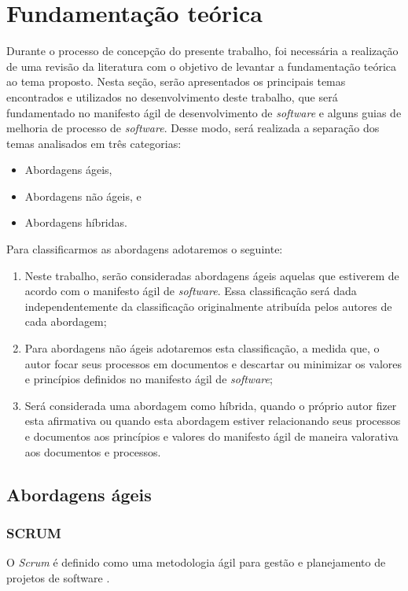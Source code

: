 \documentclass{acm_proc_article-sp}
\begin{document}
\section{Fundamentação teórica}
Durante o processo de concepção do presente trabalho, foi necessária a realização de uma revisão da literatura com o objetivo de levantar a fundamentação teórica ao tema proposto. Nesta seção, serão apresentados os principais temas encontrados e utilizados no desenvolvimento deste trabalho, que será fundamentado no manifesto ágil de desenvolvimento de \textit{software} \cite{manifesto:agil} e alguns guias de melhoria de processo de \textit{software}. Desse modo, será realizada a separação dos temas analisados em três categorias:

\begin{itemize}
\item Abordagens ágeis,
\item Abordagens não ágeis, e
\item Abordagens híbridas.
\end{itemize}

Para classificarmos as abordagens adotaremos o seguinte: 

\begin{enumerate}
\item  Neste trabalho, serão consideradas abordagens ágeis aquelas que estiverem de acordo com o manifesto ágil de \textit{software}. Essa classificação será dada independentemente da classificação originalmente atribuída pelos autores de cada abordagem;
\item Para abordagens não ágeis adotaremos esta classificação, a medida que, o autor focar seus processos em documentos e descartar ou minimizar os valores e princípios definidos no manifesto ágil de \textit{software};
\item Será considerada uma abordagem como híbrida, quando o próprio autor fizer esta afirmativa ou quando esta abordagem estiver relacionando seus processos e documentos aos princípios e valores do manifesto ágil de maneira valorativa aos documentos e processos.
\end{enumerate}

\subsection{Abordagens ágeis}

\subsubsection{SCRUM}
O \textit{Scrum} é definido como uma metodologia ágil para gestão e planejamento de projetos de software \cite{scrum:agil}.
\end{document}
